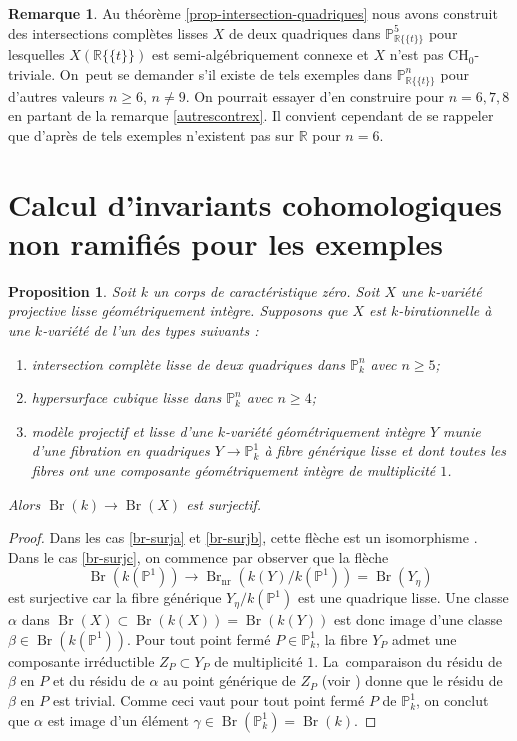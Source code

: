 \documentclass[11pt]{article}
\newenvironment{enumeratea}
{\bgroup\def\theenumi{\alph{enumi}}\begin{enumerate}}
{\end{enumerate}\egroup}
\newcommand{\CH}{\mathrm{CH}}
\newtheorem{prop}[thm]{Proposition}
\theoremstyle{definition}
\newtheorem{rmk}[thm]{Remarque}
\newcommand{\R}{\mathbb R}
\renewcommand{\P}{\mathbb P}
\newcommand{\Br}{\operatorname{Br}}
\newcommand{\on}[1]{\operatorname{#1}}
\newcommand{\puiseux}{\mathbb{R}\{\!\{t\}\!\}}
\begin{document}
\begin{rmk}
Au théorème \ref{prop-intersection-quadriques} nous avons construit des intersections complètes lisses $X$ de deux
quadriques dans $\P^5_{\puiseux}$ pour lesquelles $X(\puiseux)$ est semi-algébriquement connexe et $X$ n'est pas $\CH_0$-triviale. On~peut se demander s'il existe de tels exemples dans $\P^n_{\puiseux}$ pour d'autres valeurs $n\geq 6$, $n\neq 9$.
On pourrait essayer d'en construire pour
$n=6,7,8$ en partant de la remarque \ref{autrescontrex}.
Il convient cependant de se rappeler que d'après \cite{hassett2022rationality}
de tels exemples n'existent pas sur $\R$ pour $n=6$.
\end{rmk}

\section{Calcul d'invariants cohomologiques non ramifiés pour les exemples}\label{calcul}

\begin{prop}\label{br-surj}
Soit $k$ un corps de caractéristique zéro.
Soit $X$ une $k$-variété projective lisse
géométriquement intègre. Supposons que $X$ est $k$-birationnelle à une $k$-variété
de l'un des types suivants :

\begin{enumeratea}
\item\label{br-surja}
intersection complète lisse de deux quadriques dans $\P^n_{k}$ avec $n \geq 5$;
\item\label{br-surjb}
hypersurface cubique lisse dans $\P^n_{k}$ avec $n \geq 4$;
\item\label{br-surjc}
modèle projectif et lisse d'une $k$-variété géométriquement intègre $Y$ munie d'une
fibration en quadriques $Y \to \P^1_k$ à fibre générique lisse et dont toutes les fibres ont une composante géométriquement intègre de multiplicité $1$.
\end{enumeratea}

Alors $\Br(k) \to \Br(X)$ est surjectif.
\end{prop}

\begin{proof}

Dans les cas \eqref{br-surja} et \eqref{br-surjb}, cette flèche est un isomorphisme \cite[Th.\,8.3.2]{colliot2021brauer}.
Dans le cas \eqref{br-surjc}, on commence par observer que la flèche
\[\Br(k(\P^1)) \to \Br_{\on{nr}}(k(Y)/k(\P^1))= \Br(Y_{\eta})\] est surjective car la fibre générique $Y_{\eta}/k(\P^1)$
est une quadrique lisse. Une classe $\alpha$ dans $\Br(X) \subset \Br(k(X))= \Br(k(Y))$
est donc image d'une classe $\beta \in \Br(k(\P^1))$. Pour tout point fermé $P\in \P^1_k$, la fibre $Y_P$ admet une composante irréductible $Z_P\subset Y_P$ de multiplicité $1$. La~comparaison du résidu de $\beta$ en $P$ et du résidu de $\alpha$ au point générique de $Z_P$ (voir \cite[Cor.\,11.1.6]{colliot2021brauer}) donne que le résidu de $\beta$ en $P$ est trivial. Comme ceci vaut pour tout point fermé $P$ de $\P^1_k$, on conclut que $\alpha$ est image d'un élément $\gamma \in \Br(\P^1_{k})=\Br(k)$.
\end{proof}
\end{document}
